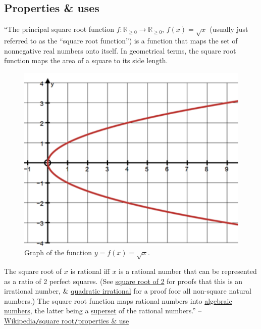 \documentclass{article}
\begin{document}
\subsection{Properties \& uses}
``The principal square root function $f:\mathbb{R}_{\ge0}\to\mathbb{R}_{\ge0}$, $f(x) = \sqrt{x}$ (usually just referred to as the ``square root function'') is a function that maps the set of nonnegative real numbers onto itself. In geometrical terms, the square root function maps the area of a square to its side length.
\begin{figure}[H]
	\centering
	\includegraphics[scale=0.4]{square_root}
	\caption{Graph of the function $y = f(x) = \sqrt{x}$.}
\end{figure}
The square root of $x$ is rational iff $x$ is a rational number that can be represented as a ratio of 2 perfect squares. (See \href{https://en.wikipedia.org/wiki/Square_root_of_2}{square root of 2} for proofs that this is an irrational number, \& \href{https://en.wikipedia.org/wiki/Quadratic_irrational}{quadratic irrational} for a proof foor all non-square natural numbers.) The square root function maps rational numbers into \href{https://en.wikipedia.org/wiki/Algebraic_number}{algebraic numbers}, the latter being a \href{https://en.wikipedia.org/wiki/Superset}{superset} of the rational numbers.'' -- \href{https://en.wikipedia.org/wiki/Square_root#Properties_and_uses}{Wikipedia\texttt{/}square root\texttt{/}properties \& use}
\end{document}
